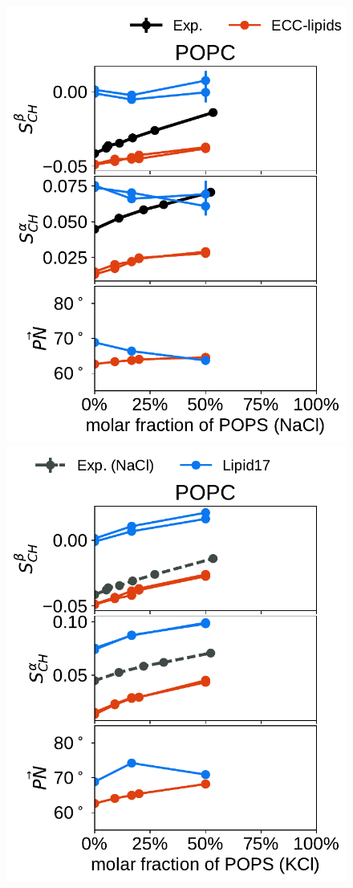 \documentclass[journal=jpcbfk,manuscript=article]{achemso}
\newlength{\figheightsmall}
\newlength{\figheight}
\begin{document}
\begin{figure}[!tbp]
  \includegraphics[height=\figheightsmall]{../Fig/order_parameters_changes_A-B_PC-PS_mix_POPC_nacl.pdf} 
  \includegraphics[height=\figheightsmall]{../Fig/order_parameters_changes_A-B_PC-PS_mix_POPC_kcl.pdf} 

\end{figure}
\end{document}
